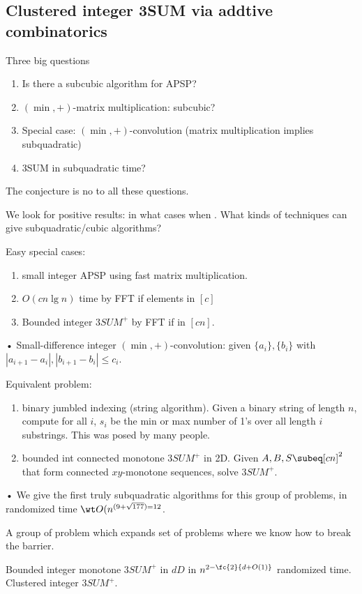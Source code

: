 \subsection{Clustered integer 3SUM via addtive combinatorics}

Three big questions
\begin{enumerate}
\item
Is there a subcubic algorithm for APSP?
\item
$(\min,+)$-matrix multiplication: subcubic?
\item
Special case: $(\min,+)$-convolution (matrix multiplication implies subquadratic)
\item
3SUM in subquadratic time?
\end{enumerate}

The conjecture is no to all these questions. 

We look for positive results: in what cases when . What kinds of techniques can give subquadratic/cubic algorithms?

Easy special cases: 
\begin{enumerate}
\item
small integer APSP using fast matrix multiplication. 
\item
$O(cn\lg n)$ time by FFT if elements in $[c]$
\item
Bounded integer $3SUM^+$ by FFT if in $[cn]$.
\end{enumerate}•
Small-difference integer $(\min, +)$-convolution: given $\{a_i\},\{b_i\}$ with $|a_{i+1}-a_i|,|b_{i+1}-b_i|\le c_i$.

Equivalent problem: 
\begin{enumerate}
\item
binary jumbled indexing (string algorithm). Given a binary string of length $n$, compute for all $i$, $s_i$ be the min or max number of 1's over all length $i$ substrings.  This was posed by many people. 
\item
bounded int connected monotone $3SUM^+$ in 2D. Given $A,B,S\subeq [cn]^2$ that form connected $xy$-monotone sequences, solve $3SUM^+$. %
\end{enumerate}•
We give the first truly subquadratic algorithms for this group of problems, in randomized time $\wt O(n^{(9+\sqrt{177})=12}$.

A group of problem which expands set of problems where we know how to break the barrier.

Bounded integer monotone $3SUM^+$ in $dD$ in $n^{2-\fc{2}{d+O(1)}}$ randomized time. Clustered integer $3SUM^+$.

